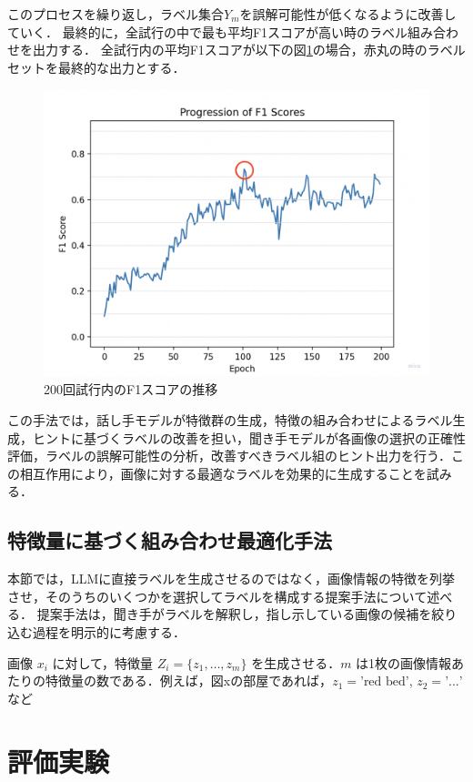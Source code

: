 \documentclass[a4paper,11pt]{jreport}
\begin{document}
このプロセスを繰り返し，ラベル集合$Y_m$を誤解可能性が低くなるように改善していく．
最終的に，全試行の中で最も平均F1スコアが高い時のラベル組み合わせを出力する．
全試行内の平均F1スコアが以下の図\ref{fig:f1_score}の場合，赤丸の時のラベルセットを最終的な出力とする．
\begin{figure}[H]
  \centering
  \includegraphics[width=\linewidth]{figures/f1_score.png}
  \caption{200回試行内のF1スコアの推移}
  \label{fig:f1_score}
\end{figure}
この手法では，話し手モデルが特徴群の生成，特徴の組み合わせによるラベル生成，ヒントに基づくラベルの改善を担い，聞き手モデルが各画像の選択の正確性評価，ラベルの誤解可能性の分析，改善すべきラベル組のヒント出力を行う．この相互作用により，画像に対する最適なラベルを効果的に生成することを試みる．

\section{特徴量に基づく組み合わせ最適化手法}
本節では，LLMに直接ラベルを生成させるのではなく，画像情報の特徴を列挙させ，そのうちのいくつかを選択してラベルを構成する提案手法について述べる．
提案手法は，聞き手がラベルを解釈し，指し示している画像の候補を絞り込む過程を明示的に考慮する．

画像 $x_i$ に対して，特徴量 $Z_i = \{z_1, \ldots, z_m\}$ を生成させる．$m$ は1枚の画像情報あたりの特徴量の数である．例えば，図xの部屋であれば，$z_1 = \text{'red bed'}$, $z_2 = \text{'...'}$ など




\chapter{評価実験}
\end{document}
